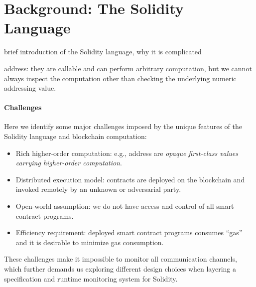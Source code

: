 \section{Background: The Solidity Language}

brief introduction of the Solidity language, why it is complicated

address: they are callable and can perform arbitrary computation, but we cannot always
inspect the computation other than checking the underlying numeric addressing value.

\paragraph{Challenges}
Here we identify some major challenges imposed by the unique features of the
Solidity language and blockchain computation:

\begin{itemize}
  \item Rich higher-order computation:
    e.g., address are \emph{opaque first-class values carrying higher-order
    computation}.
  \item Distributed execution model:
    contracts are deployed on the blockchain and invoked remotely by an unknown
    or adversarial party.
  \item Open-world assumption:
    we do not have access and control of all smart contract programs.
  \item Efficiency requirement:
    deployed smart contract programs consumes ``gas'' and it is desirable
    to minimize gas consumption.
\end{itemize}

These challenges make it impossible to monitor all communication channels,
which further demands us exploring different design choices when layering
a specification and runtime monitoring system for Solidity.


